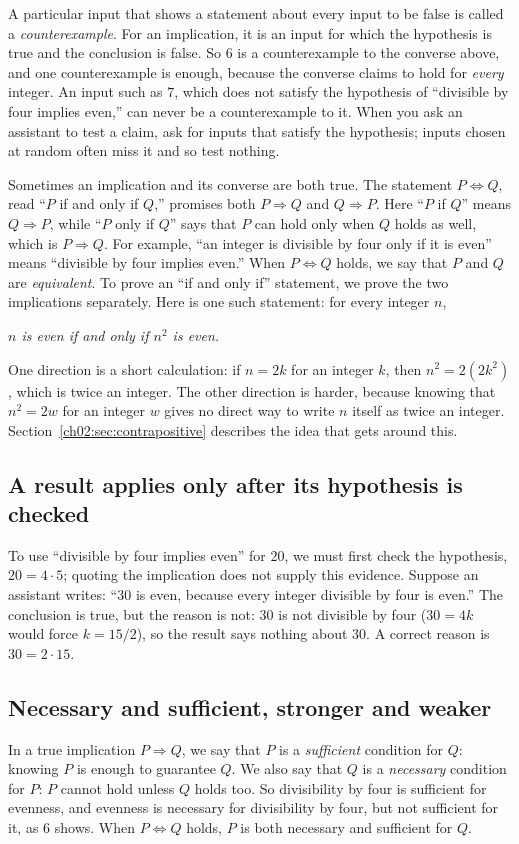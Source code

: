 A particular input that shows a statement about every input to be false is called a \emph{counterexample}. For an implication, it is an input for which the hypothesis is true and the conclusion is false. So $6$ is a counterexample to the converse above, and one counterexample is enough, because the converse claims to hold for \emph{every} integer. An input such as $7$, which does not satisfy the hypothesis of ``divisible by four implies even,'' can never be a counterexample to it. When you ask an assistant to test a claim, ask for inputs that satisfy the hypothesis; inputs chosen at random often miss it and so test nothing.

Sometimes an implication and its converse are both true. The statement $P\Leftrightarrow Q$, read ``$P$ if and only if $Q$,'' promises both $P\Rightarrow Q$ and $Q\Rightarrow P$. Here ``$P$ if $Q$'' means $Q\Rightarrow P$, while ``$P$ only if $Q$'' says that $P$ can hold only when $Q$ holds as well, which is $P\Rightarrow Q$. For example, ``an integer is divisible by four only if it is even'' means ``divisible by four implies even.'' When $P\Leftrightarrow Q$ holds, we say that $P$ and $Q$ are \emph{equivalent}. To prove an ``if and only if'' statement, we prove the two implications separately. Here is one such statement: for every integer $n$,
\begin{center}
\emph{$n$ is even if and only if $n^2$ is even.}
\end{center}
One direction is a short calculation: if $n=2k$ for an integer $k$, then $n^2=2(2k^2)$, which is twice an integer. The other direction is harder, because knowing that $n^2=2w$ for an integer $w$ gives no direct way to write $n$ itself as twice an integer. Section~\ref{ch02:sec:contrapositive} describes the idea that gets around this.

\subsection*{A result applies only after its hypothesis is checked}
To use ``divisible by four implies even'' for $20$, we must first check the hypothesis, $20=4\cdot5$; quoting the implication does not supply this evidence. Suppose an assistant writes: ``$30$ is even, because every integer divisible by four is even.'' The conclusion is true, but the reason is not: $30$ is not divisible by four ($30=4k$ would force $k=15/2$), so the result says nothing about $30$. A correct reason is $30=2\cdot15$.

\subsection*{Necessary and sufficient, stronger and weaker}
In a true implication $P\Rightarrow Q$, we say that $P$ is a \emph{sufficient} condition for $Q$: knowing $P$ is enough to guarantee $Q$. We also say that $Q$ is a \emph{necessary} condition for $P$: $P$ cannot hold unless $Q$ holds too. So divisibility by four is sufficient for evenness, and evenness is necessary for divisibility by four, but not sufficient for it, as $6$ shows. When $P\Leftrightarrow Q$ holds, $P$ is both necessary and sufficient for $Q$.

